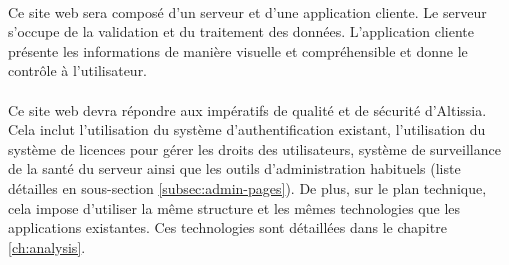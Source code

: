 \paragraph{}
Ce site web sera composé d'un serveur et d'une application cliente.
Le serveur s'occupe de la validation et du traitement des données.
L'application cliente présente les informations de manière visuelle et compréhensible et donne le contrôle à l'utilisateur.

\paragraph{}
Ce site web devra répondre aux impératifs de qualité et de sécurité d'Altissia.
Cela inclut l'utilisation du système d'authentification existant, l'utilisation du système de licences\fnmark{} pour gérer les droits des utilisateurs, système de surveillance de la santé du serveur ainsi que les outils d'administration habituels (liste détailles en sous-section \ref{subsec:admin-pages}).
De plus, sur le plan technique, cela impose d'utiliser la même structure et les mêmes technologies que les applications existantes.
Ces technologies sont détaillées dans le chapitre \ref{ch:analysis}.
